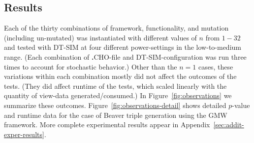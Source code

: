 \documentclass[acmlarge, manuscript, screen, review, anonymous, table]{acmart}
\newcommand{\langname}{\textsc{\textbf{.}CHO}\xspace}
\newcommand{\toolname}{\textsc{DT-SIM}\xspace}
\begin{document}
\subsection{Results}
\label{sec:e2_results}

Each of the thirty combinations of framework, functionality, and mutation (including un-mutated)
was instantiated with different values of $n$ from $1-32$ and tested with \toolname at four different power-settings in the low-to-medium range.
(Each combination of \langname-file and \toolname-configuration was run three times to account for stochastic behavior.)
Other than the $n=1$ cases, these variations within each combination mostly did not affect the outcomes of the tests.
(They did affect runtime of the tests, which scaled linearly with the quantity of view-data generated/consumed.)
In Figure~\ref{fig:observations} we summarize these outcomes.
Figure~\ref{fig:observations-detail} shows detailed $p$-value and runtime data for the case of Beaver triple generation using the GMW framework.
More complete experimental results appear in Appendix~\ref{sec:addit-exper-results}.
\end{document}
